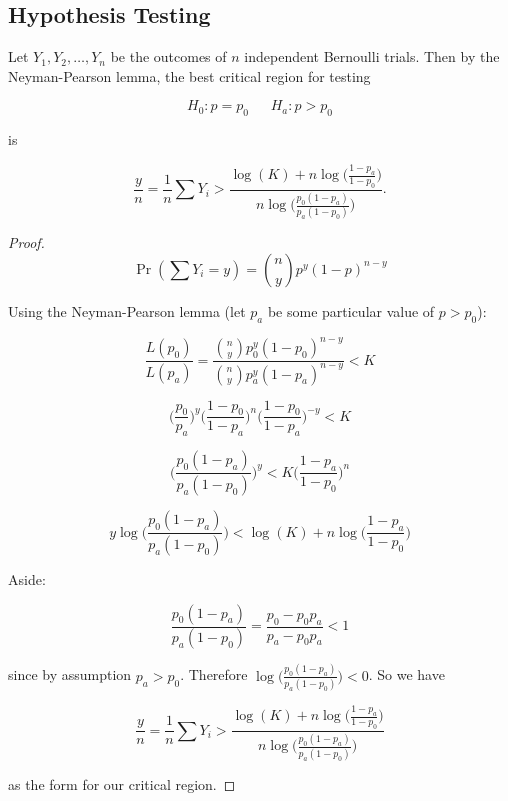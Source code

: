 \subsection{Hypothesis Testing}

\begin{proposition} Let \(Y_1, Y_2, \ldots, Y_n\) be the outcomes of \(n\) independent Bernoulli trials. Then by the Neyman-Pearson lemma, the best critical region for testing

\[
H_0: p = p_0 \ \ \ \ \ \ \ H_a: p > p_0
\]

is

\[
\frac{y}{n} = \frac{1}{n}\sum Y_i  > \frac{\log(K) + n \log \bigg( \frac{1 - p_a}{1 - p_0} \bigg)}{n\log \bigg( \frac{p_0(1 - p_a)}{p_a(1 - p_0)} \bigg)}.
\]

\end{proposition}

\begin{proof}

\[
\Pr(\sum Y_i = y) = {n \choose y}p^y(1-p)^{n-y}
\]

Using the Neyman-Pearson lemma (let \(p_a\) be some particular value of \(p > p_0\)):

\[
\frac{L(p_0)}{L(p_a)} = \frac{{n \choose y}p_0^y(1-p_0)^{n-y}}{{n \choose y}p_a^y(1-p_a)^{n-y}} < K
\]

\[
\bigg( \frac{p_0}{p_a} \bigg) ^y   \bigg( \frac{1 - p_0}{1 - p_a} \bigg)^{n} \bigg( \frac{1 - p_0}{1 - p_a} \bigg)^{-y}  < K
\]

\[
\bigg( \frac{p_0(1 - p_a)}{p_a(1 - p_0)} \bigg) ^y  < K  \bigg( \frac{1 - p_a}{1 - p_0} \bigg)^{n} 
\]

\[
y \log \bigg( \frac{p_0(1 - p_a)}{p_a(1 - p_0)} \bigg) < \log(K) + n \log \bigg( \frac{1 - p_a}{1 - p_0} \bigg)
\]

Aside:

\[
\frac{p_0(1 - p_a)}{p_a(1 - p_0)} = \frac{p_0 - p_0 p_a}{p_a - p_0 p_a} < 1
\]

since by assumption \(p_a > p_0\). Therefore \( \log \bigg( \frac{p_0(1 - p_a)}{p_a(1 - p_0)} \bigg) < 0 \). So we have

\[
\frac{y}{n} = \frac{1}{n}\sum Y_i  > \frac{\log(K) + n \log \bigg( \frac{1 - p_a}{1 - p_0} \bigg)}{n\log \bigg( \frac{p_0(1 - p_a)}{p_a(1 - p_0)} \bigg)}
\]

as the form for our critical region.

\end{proof}




%
%
%







